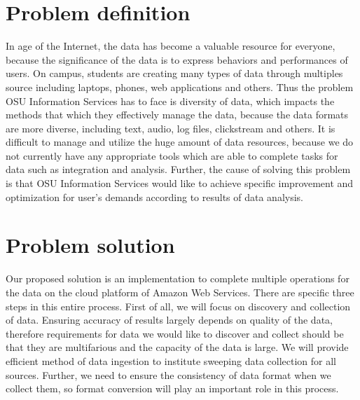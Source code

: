 \documentclass[letterpaper,10pt]{article}
\begin{document}
	\section{Problem definition}
	In age of the Internet, the data has become a valuable resource for everyone, because the significance of the data is to express behaviors and performances of users. On campus, students are creating many types of data through multiples source including laptops, phones, web applications and others. Thus the problem OSU Information Services has to face is diversity of data, which impacts the methods that which they effectively manage the data, because the data formats are more diverse, including text, audio, log files, clickstream and others. It is difficult to manage and utilize the huge amount of data resources, because we do not currently have any appropriate tools which are able to complete tasks for data such as integration and analysis. Further, the cause of solving this problem is that OSU Information Services would like to achieve specific improvement and optimization for user’s demands according to results of data analysis.

	\section{Problem solution}
	Our proposed solution is an implementation to complete multiple operations for the data on the cloud platform of Amazon Web Services. There are specific three steps in this entire process. First of all, we will focus on discovery and collection of data. Ensuring accuracy of results largely depends on quality of the data, therefore requirements for data we would like to discover and collect should be that they are multifarious and the capacity of the data is large. We will provide efficient method of data ingestion to institute sweeping data collection for all sources. Further, we need to ensure the consistency of data format when we collect them, so format conversion will play an important role in this process.\\ 
\end{document}

